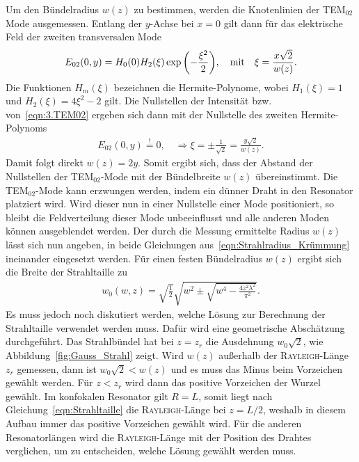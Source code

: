 \documentclass[a4paper,twoside,final]{article}
\begin{document}
Um den Bündelradius $w(z)$ zu bestimmen, werden die Knotenlinien der TEM$_{02}$ Mode ausgemessen. Entlang der $y$-Achse bei $x=0$ gilt dann für das elektrische Feld der zweiten transversalen Mode~\cite{Eichler}
\begin{align}\label{eqn:3.TEM02}
  E_{02}(0,y) = H_0(0) H_2(\xi) \exp\qty(-\frac{\xi^2}{2}), \quad \text{mit} \quad \xi = \frac{x\sqrt{2}}{w(z)}.
\end{align}
Die Funktionen $H_m(\xi)$ bezeichnen die Hermite-Polynome, wobei $H_1(\xi) = 1$ und $H_2(\xi) = 4\xi^2- 2$ gilt. Die Nullstellen der Intensität bzw. von~\eqref{eqn:3.TEM02} ergeben sich dann mit der Nullstelle des zweiten Hermite-Polynoms
\begin{align}
  E_{02}(0,y) \overset{!}{=} 0, \quad \Rightarrow \xi = \pm \frac{1}{\sqrt{2}} = \frac{y \sqrt{2}}{w(z)}.
\end{align}
Damit folgt direkt $w(z) = 2y$. Somit ergibt sich, dass der Abstand der Nullstellen der TEM$_{02}$-Mode mit der Bündelbreite $w(z)$ übereinstimmt. Die TEM$_{02}$-Mode kann erzwungen werden, indem ein dünner Draht in den Resonator platziert wird. Wird dieser nun in einer Nullstelle einer Mode positioniert, so bleibt die Feldverteilung dieser Mode unbeeinflusst und alle anderen Moden können ausgeblendet werden. Der durch die Messung ermittelte Radius $w(z)$ lässt sich nun angeben, in beide Gleichungen aus~\eqref{eqn:Strahlradius_Krümmung} ineinander eingesetzt werden. Für einen festen Bündelradius $w(z)$ ergibt sich die Breite der Strahltaille zu~\cite{Anleitung}
\begin{align}\label{eqn:Strahltaille_Experimentell}
  w_0(w,z) = \sqrt{\frac{1}{2}} \sqrt{w^2 \pm \sqrt{w^4-\frac{4z^2 \lambda^2}{\pi^2}}}.
\end{align}
Es muss jedoch noch diskutiert werden, welche Lösung zur Berechnung der Strahltaille verwendet werden muss. Dafür wird eine geometrische Abschätzung durchgeführt. Das Strahlbündel hat bei $z = z_r$ die Ausdehnung $w_0 \sqrt{2}$, wie Abbildung~\ref{fig:Gauss_Strahl} zeigt. Wird $w(z)$ außerhalb der \textsc{Rayleigh}-Länge $z_r$ gemessen, dann ist $w_0 \sqrt{2} < w(z)$ und es muss das Minus beim Vorzeichen gewählt werden. Für $z < z_r$ wird dann das positive Vorzeichen der Wurzel gewählt. Im konfokalen Resonator gilt $R=L$, somit liegt nach Gleichung~\eqref{eqn:Strahltaille} die \textsc{Rayleigh}-Länge bei $z = L/2$, weshalb in diesem Aufbau immer das positive Vorzeichen gewählt wird. Für die anderen Resonatorlängen wird die \textsc{Rayleigh}-Länge mit der Position des Drahtes verglichen, um zu entscheiden, welche Lösung gewählt werden muss.
\end{document}
